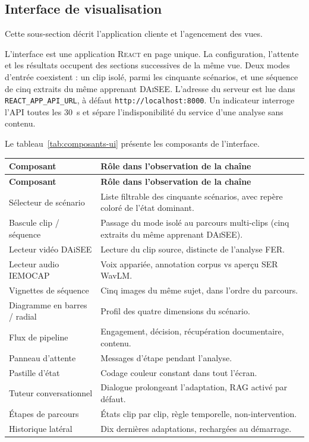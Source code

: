 \subsection{Interface de visualisation}
\label{subsec:impl-interface}

Cette sous-section décrit l'application cliente et l'agencement
des vues.

L'interface est une application \textsc{React} en page unique. La
configuration, l'attente et les résultats occupent des sections
successives de la même vue. Deux modes d'entrée coexistent : un clip
isolé, parmi les cinquante scénarios, et une séquence de cinq extraits
du même apprenant \textsc{DAiSEE}.
L'adresse du serveur est lue dans \texttt{REACT\_APP\_API\_URL}, à
défaut \texttt{http://localhost:8000}. Un indicateur interroge l'API
toutes les 30~s et sépare l'indisponibilité du service d'une analyse
sans contenu.

Le tableau~\ref{tab:composants-ui} présente les composants de l'interface.

{\small
\renewcommand{\arraystretch}{1.18}
\setlength{\tabcolsep}{4pt}
\begin{xltabular}{\textwidth}{|>{\raggedright\arraybackslash}X|>{\raggedright\arraybackslash}X|}
\hline
{}
\textbf{Composant} & \textbf{Rôle dans l'observation de la chaîne} \\
\hline
\endfirsthead
\hline
{}
\textbf{Composant} & \textbf{Rôle dans l'observation de la chaîne} \\
\hline
\endhead
\endfoot
\endlastfoot
Sélecteur de scénario & Liste filtrable des cinquante scénarios, avec repère
coloré de l'état dominant. \\
\hline
Bascule clip / séquence & Passage du mode isolé au parcours multi-clips
(cinq extraits du même apprenant \textsc{DAiSEE}). \\
\hline
Lecteur vidéo DAiSEE & Lecture du clip source, distincte de l'analyse FER. \\
\hline
Lecteur audio IEMOCAP & Voix appariée, annotation corpus vs aperçu SER WavLM. \\
\hline
Vignettes de séquence & Cinq images du même sujet, dans l'ordre du parcours. \\
\hline
Diagramme en barres / radial & Profil des quatre dimensions du scénario. \\
\hline
Flux de pipeline & Engagement, décision, récupération documentaire, contenu. \\
\hline
Panneau d'attente & Messages d'étape pendant l'analyse. \\
\hline
Pastille d'état & Codage couleur constant dans tout l'écran. \\
\hline
Tuteur conversationnel & Dialogue prolongeant l'adaptation, RAG activé par défaut. \\
\hline
Étapes de parcours & États clip par clip, règle temporelle, non-intervention. \\
\hline
Historique latéral & Dix dernières adaptations, rechargées au démarrage. \\
\hline
\end{xltabular}
\label{tab:composants-ui}
}

